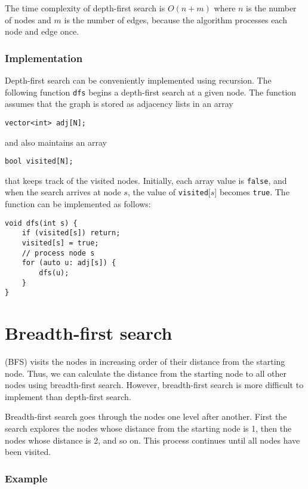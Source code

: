 The time complexity of depth-first search is $O(n+m)$
where $n$ is the number of nodes and $m$ is the
number of edges,
because the algorithm processes each node and edge once.

\subsubsection*{Implementation}

Depth-first search can be conveniently
implemented using recursion.
The following function \texttt{dfs} begins
a depth-first search at a given node.
The function assumes that the graph is
stored as adjacency lists in an array
\begin{lstlisting}
vector<int> adj[N];
\end{lstlisting}
and also maintains an array
\begin{lstlisting}
bool visited[N];
\end{lstlisting}
that keeps track of the visited nodes.
Initially, each array value is \texttt{false},
and when the search arrives at node $s$,
the value of \texttt{visited}[$s$] becomes \texttt{true}.
The function can be implemented as follows:
\begin{lstlisting}
void dfs(int s) {
    if (visited[s]) return;
    visited[s] = true;
    // process node s
    for (auto u: adj[s]) {
        dfs(u);
    }
}
\end{lstlisting}

\section{Breadth-first search}


 (BFS) visits the nodes
in increasing order of their distance
from the starting node.
Thus, we can calculate the distance
from the starting node to all other
nodes using breadth-first search.
However, breadth-first search is more difficult
to implement than depth-first search.

Breadth-first search goes through the nodes
one level after another.
First the search explores the nodes whose
distance from the starting node is 1,
then the nodes whose distance is 2, and so on.
This process continues until all nodes
have been visited.

\subsubsection*{Example}

